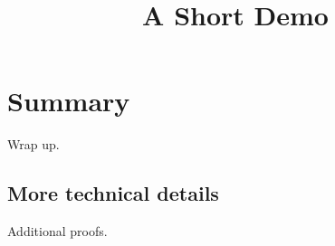 \documentclass[article]{jss}
\title{A Short Demo}
\begin{document}
\section{Summary}
Wrap up.

\newpage
\begin{appendix}
\section{More technical details}
Additional proofs.
\end{appendix}
\end{document}
